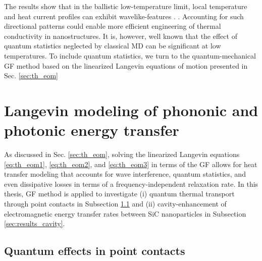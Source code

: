 The results show that in the ballistic low-temperature limit, local temperature and heat current profiles can exhibit wavelike-features . . Accounting for such directional patterns could enable more efficient engineering of thermal conductivity in nanostructures. It is, however, well known that the effect of quantum statistics neglected by classical MD can be significant at low temperatures. To include quantum statistics, we turn to the quantum-mechanical GF method based on the linearized Langevin equations of motion presented in Sec. \ref{sec:th_eom}


\section{Langevin modeling of phononic and photonic energy transfer}
\label{sec:results_gf}

As discussed in Sec. \ref{sec:th_eom}, solving the linearized Langevin equations \eqref{eq:th_eom1}, \eqref{eq:th_eom2}, and \eqref{eq:th_eom3} in terms of the GF allows for heat transfer modeling that accounts for wave interference, quantum statistics, and even dissipative losses in terms of a frequency-independent relaxation rate. In this thesis, GF method is applied to investigate (i) quantum thermal transport through point contacts in Subsection \ref{sec:results_schb} and (ii) cavity-en\-hance\-ment of electromagnetic energy transfer rates between SiC nanoparticles in Subsection \ref{sec:results_cavity}. 

\subsection{Quantum effects in point contacts}
\label{sec:results_schb}

